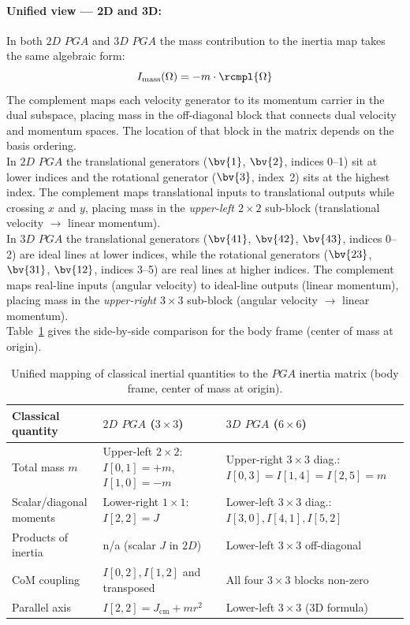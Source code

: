 \paragraph{Unified view --- 2D and 3D:}
In both $2D$ $PGA$ and $3D$ $PGA$ the mass contribution to the inertia map takes the same
algebraic form:
\begin{equation}
    I_\mathrm{mass}(\Omega) = -m \cdot \rcmpl{\Omega}
    \label{eq:inertia_mass_dual}
\end{equation}
The complement maps each velocity generator to its momentum carrier in the dual subspace,
placing mass in the off-diagonal block that connects dual velocity and momentum spaces.
The location of that block in the matrix depends on the basis ordering. \\

In $2D$ $PGA$ the translational generators ($\bv{1}$, $\bv{2}$, indices 0--1) sit at lower
indices and the rotational generator ($\bv{3}$, index~2) sits at the highest index. The
complement maps translational inputs to translational outputs while crossing $x$ and $y$,
placing mass in the \emph{upper-left $2\times2$} sub-block (translational velocity $\to$
linear momentum). \\

In $3D$ $PGA$ the translational generators ($\bv{41}$, $\bv{42}$, $\bv{43}$, indices 0--2)
are ideal lines at lower indices, while the rotational generators ($\bv{23}$, $\bv{31}$,
$\bv{12}$, indices 3--5) are real lines at higher indices. The complement maps real-line
inputs (angular velocity) to ideal-line outputs (linear momentum), placing mass in the
\emph{upper-right $3\times3$} sub-block (angular velocity $\to$ linear momentum). \\

Table~\ref{tab:unified_pga} gives the side-by-side comparison for the body frame (center
of mass at origin).

\begin{table}[h!]
\centering\small
\begin{tabular}{p{3.1cm}|p{4.1cm}|p{5.1cm}}
\hline
Classical quantity & $2D$ $PGA$ ($3\times3$) & $3D$ $PGA$ ($6\times6$) \\
\hline
Total mass $m$ &
    Upper-left $2\times2$: $I[0,1]=+m$, $I[1,0]=-m$ &
    Upper-right $3\times3$ diag.: $I[0,3]=I[1,4]=I[2,5]=m$ \\
Scalar/diagonal moments &
    Lower-right $1\times1$: $I[2,2]=J$ &
    Lower-left $3\times3$ diag.: $I[3,0], I[4,1], I[5,2]$ \\
Products of inertia &
    n/a (scalar $J$ in $2D$) &
    Lower-left $3\times3$ off-diagonal \\
CoM coupling &
    $I[0,2], I[1,2]$ and transposed &
    All four $3\times3$ blocks non-zero \\
Parallel axis &
    $I[2,2] = J_\mathrm{cm} + mr^2$ &
    Lower-left $3\times3$ (3D formula) \\
\hline
\end{tabular}
\caption{Unified mapping of classical inertial quantities to the $PGA$ inertia matrix
(body frame, center of mass at origin).}
\label{tab:unified_pga}
\end{table}

